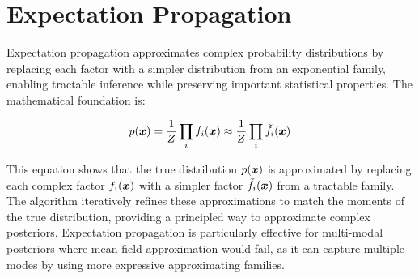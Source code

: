 
\section{Expectation Propagation }
\label{sec:ep}

Expectation propagation approximates complex probability distributions by replacing each factor with a simpler distribution from an exponential family, enabling tractable inference while preserving important statistical properties. The mathematical foundation is:

\begin{equation}
p(\boldsymbol{x}) = \frac{1}{Z} \prod_i f_i(\boldsymbol{x}) \approx \frac{1}{Z} \prod_i \tilde{f}_i(\boldsymbol{x})
\end{equation}

This equation shows that the true distribution $p(\boldsymbol{x})$ is approximated by replacing each complex factor $f_i(\boldsymbol{x})$ with a simpler factor $\tilde{f}_i(\boldsymbol{x})$ from a tractable family. The algorithm iteratively refines these approximations to match the moments of the true distribution, providing a principled way to approximate complex posteriors. Expectation propagation is particularly effective for multi-modal posteriors where mean field approximation would fail, as it can capture multiple modes by using more expressive approximating families.





